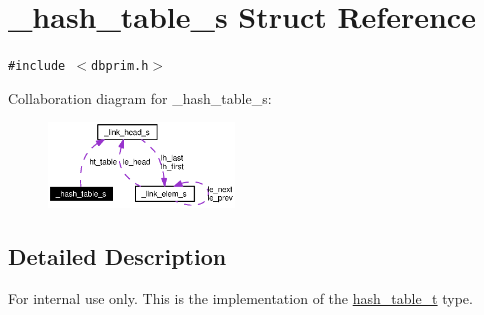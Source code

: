 \hypertarget{struct__hash__table__s}{
\section{\_\-hash\_\-table\_\-s Struct Reference}
\label{struct__hash__table__s}
}
{\tt \#include $<$dbprim.h$>$}

Collaboration diagram for \_\-hash\_\-table\_\-s:\begin{figure}[H]
\begin{center}
\leavevmode
\includegraphics[width=140pt]{struct__hash__table__s__coll__graph}
\end{center}
\end{figure}


\subsection{Detailed Description}
\begin{Desc}
\item[For internal use only.]
This is the implementation of the \hyperlink{group__dbprim__hash_ga1}{hash\_\-table\_\-t} type.\end{Desc}




